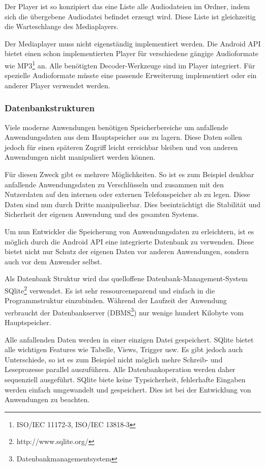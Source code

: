 Der Player ist so konzipiert das eine Liste alle Audiodateien im Ordner, indem sich die übergebene Audiodatei befindet erzeugt wird. Diese Liste ist gleichzeitig die Warteschlange des Mediaplayers.

Der Mediaplayer muss nicht eigenständig implementiert werden. Die Android API bietet einen schon implementierten Player für verschiedene gängige Audioformate wie MP3\footnote{ISO/IEC 11172-3, ISO/IEC 13818-3} an. Alle benötigten Decoder-Werkzeuge sind im Player integriert. Für spezielle Audioformate müsste eine passende Erweiterung implementiert oder ein anderer Player verwendet werden.

\subsubsection{Datenbankstrukturen}
\label{Datenbankstrukturen}

Viele moderne Anwendungen benötigen Speicherbereiche um anfallende Anwendungsdaten aus dem Hauptspeicher aus zu lagern. Diese Daten sollen jedoch für einen späteren Zugriff leicht erreichbar bleiben und von anderen Anwendungen nicht manipuliert werden können.

Für diesen Zweck gibt es mehrere Möglichkeiten. So ist es zum Beispiel denkbar anfallende Anwendungsdaten zu Verschlüsseln und zusammen mit den Nutzerdaten auf den internen oder externen Telefonspeicher ab zu legen. Diese Daten sind nun durch Dritte manipulierbar. Dies beeinträchtigt die Stabilität und Sicherheit der eigenen Anwendung und des gesamten Systems.

Um nun Entwickler die Speicherung von Anwendungsdaten zu erleichtern, ist es möglich durch die Android API eine integrierte Datenbank zu verwenden. Diese bietet nicht nur Schutz der eigenen Daten vor anderen Anwendungen, sondern auch vor dem Anwender selbst.

Als Datenbank Struktur wird das quelloffene Datenbank-Management-System SQlite\footnote{http://www.sqlite.org/} verwendet. Es ist sehr ressourcensparend und einfach in die Programmstruktur einzubinden. Während der Laufzeit der Anwendung verbraucht der Datenbankserver (DBMS\footnote{Datenbankmanagementsystem}) nur wenige hundert Kilobyte vom Hauptspeicher.

Alle anfallenden Daten werden in einer einzigen Datei gespeichert. SQlite bietet alle wichtigen Features wie Tabelle, Views, Trigger usw. Es gibt jedoch auch Unterschiede, so ist es zum Beispiel nicht möglich mehre Schreib- und Leseprozesse parallel auszuführen. Alle Datenbankoperation werden daher sequenziell ausgeführt. SQlite biete keine Typsicherheit, fehlerhafte Eingaben werden einfach umgewandelt und gespeichert. Dies ist bei der Entwicklung von Anwendungen zu beachten.

